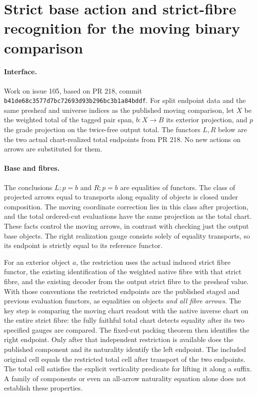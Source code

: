 \section*{Strict base action and strict-fibre recognition for the moving binary comparison}
\paragraph{Interface.} Work on issue 105, based on PR 218, commit
\texttt{b41de68c3577d7bc72693d93b296bc3b1a84bddf}. For split endpoint
data and the same presheaf and universe indices as the published moving comparison,
let $X$ be the weighted total of the tagged pair span, $b:X\to B$ its exterior
projection, and $p$ the grade projection on the twice-free output total.
The functors $L,R$ below are the two actual chart-realized total endpoints
from PR 218. No new actions on arrows are substituted for them.

\paragraph{Base and fibres.} The conclusions $L;p=b$ and $R;p=b$ are
equalities of functors. The class of projected arrows equal to transports
along equality of objects is closed under composition. The moving coordinate
correction lies in this class after projection, and the total ordered-cut
evaluations have the same projection as the total chart. These facts control
the moving arrows, in contrast with checking just the output base objects.
The right realization gauge consists solely of equality transports, so its
endpoint is strictly equal to its reference functor.

For an exterior object $a$, the restriction uses the actual induced strict
fibre functor, the existing identification of the weighted native fibre
with that strict fibre, and the existing decoder from the output strict
fibre to the presheaf value. With those conventions the restricted endpoints
are the published staged and previous evaluation functors, as equalities on
objects \emph{and all fibre arrows}. The key step is comparing the moving chart
readout with the native inverse chart on the entire strict fibre: the
fully faithful total chart detects equality after its two specified gauges
are compared. The fixed-cut packing theorem then identifies the right
endpoint. Only after that independent restriction is available does the
published component and its naturality identify the left endpoint.
The included original cell equals the restricted total cell after transport
of the two endpoints. The total cell satisfies the explicit verticality
predicate for lifting it along a suffix. A family of components or even
an all-arrow naturality equation alone does not establish these properties.

